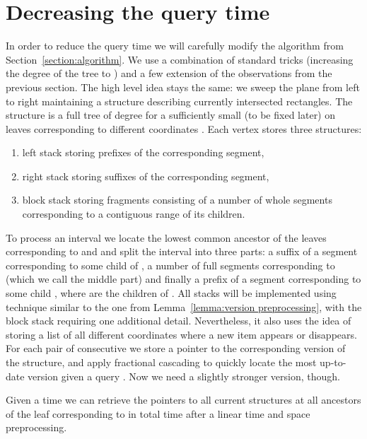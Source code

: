 \documentclass[runningheads]{llncs}
\begin{document}
\section{Decreasing the query time}
\label{section:algorithm2}

In order to reduce the query time we will carefully modify the algorithm from Section~\ref{section:algorithm}. We use a combination of standard tricks (increasing the degree of the tree to ) and a few extension of the observations from the previous section. The high level idea stays the same: we sweep the plane from left to right maintaining a structure describing currently intersected rectangles.  The structure is a full tree of degree  for a sufficiently small  (to be fixed later) on  leaves corresponding to different  coordinates . Each vertex stores three structures:

\begin{enumerate}
\item left stack storing prefixes of the corresponding segment,
\item right stack storing suffixes of the corresponding segment,
\item block stack storing fragments consisting of a number of whole segments corresponding to a contiguous range of its children.
\end{enumerate}

To process an interval  we locate the lowest common ancestor  of the leaves corresponding to  and  and split the interval into three parts: a suffix of a segment corresponding to some child of , a number of full segments corresponding to  (which we call the middle part) and finally a prefix of a segment corresponding to some child , where  are the children of .
All stacks will be implemented using technique similar to the one from Lemma~\ref{lemma:version preprocessing}, with the block stack requiring one additional detail. Nevertheless, it also uses the idea of storing a list of all different  coordinates where a new item appears or disappears. For each pair of consecutive  we store a pointer to the corresponding version of the structure, and apply fractional cascading to quickly locate the most up-to-date version given a query . Now we need a slightly stronger version, though.

\begin{lemma}\label{lemma:fast cascading}
Given a time  we can retrieve the pointers to all current structures at all ancestors of the leaf corresponding to  in total  time after a linear time and space preprocessing.
\end{lemma}
\end{document}
